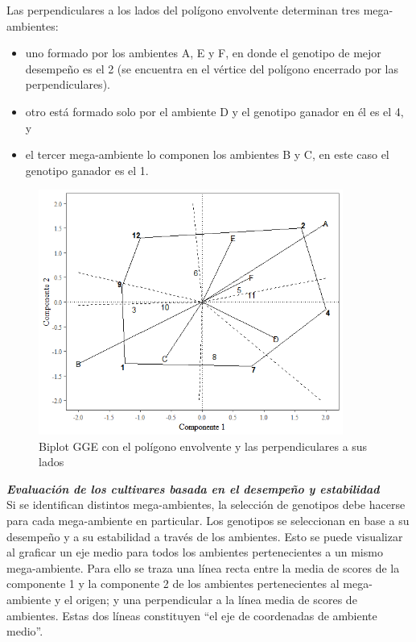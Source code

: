 Las perpendiculares a los lados del polígono envolvente determinan tres mega-ambientes:
\begin{itemize}
\item uno formado por los ambientes A, E y F, en donde el genotipo de mejor desempeño es el 2 (se
encuentra en el vértice del polígono encerrado por las perpendiculares).
\item otro está formado solo por el ambiente D y el genotipo ganador en él es el 4, y
\item  el tercer mega-ambiente lo componen los ambientes B y C, en este caso el genotipo ganador es el 1.
\end{itemize}


\begin{figure}[h!]
	\begin{center}
		\includegraphics[width=10cm]{./Graficos/poligono_GGE.png}
	\end{center}
	\caption{Biplot GGE con el polígono envolvente y las perpendiculares a sus lados}
	\label{fig:fig315}
\end{figure}




\textbf{\emph{Evaluación de los cultivares basada en el desempeño y estabilidad}}\\

Si se identifican distintos mega-ambientes, la selección de genotipos debe hacerse para cada mega-ambiente en particular. Los genotipos se seleccionan en base a su desempeño y a su estabilidad a través de los ambientes. Esto se puede visualizar al graficar un eje medio para todos los ambientes pertenecientes a un mismo mega-ambiente. Para ello se traza una línea recta entre la media de scores de la componente 1 y la componente 2 de los ambientes pertenecientes al mega-ambiente y el origen; y una perpendicular a la línea media de scores de ambientes. Estas dos líneas constituyen ``el eje de coordenadas de ambiente medio''.

